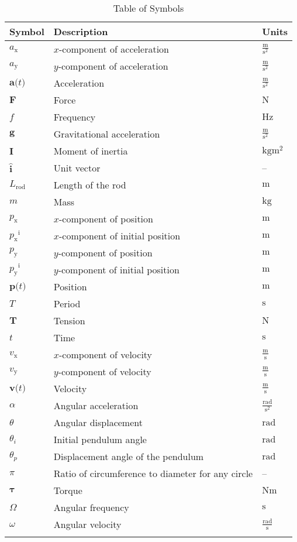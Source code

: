 \documentclass[12pt]{article}
\begin{document}
\begin{longtable}{l l l}
\toprule
\textbf{Symbol} & \textbf{Description} & \textbf{Units}
\\
\midrule
\endhead
${a_{\text{x}}}$ & $x$-component of acceleration & $\frac{\text{m}}{\text{s}^{2}}$
\\
${a_{\text{y}}}$ & $y$-component of acceleration & $\frac{\text{m}}{\text{s}^{2}}$
\\
$\symbf{a}\text{(}t\text{)}$ & Acceleration & $\frac{\text{m}}{\text{s}^{2}}$
\\
$\symbf{F}$ & Force & ${\text{N}}$
\\
$f$ & Frequency & ${\text{Hz}}$
\\
$\symbf{g}$ & Gravitational acceleration & $\frac{\text{m}}{\text{s}^{2}}$
\\
$\symbf{I}$ & Moment of inertia & $\text{kg}\text{m}^{2}$
\\
$\symbf{\hat{i}}$ & Unit vector & --
\\
${L_{\text{rod}}}$ & Length of the rod & ${\text{m}}$
\\
$m$ & Mass & ${\text{kg}}$
\\
${p_{\text{x}}}$ & $x$-component of position & ${\text{m}}$
\\
${{p_{\text{x}}}^{\text{i}}}$ & $x$-component of initial position & ${\text{m}}$
\\
${p_{\text{y}}}$ & $y$-component of position & ${\text{m}}$
\\
${{p_{\text{y}}}^{\text{i}}}$ & $y$-component of initial position & ${\text{m}}$
\\
$\symbf{p}\text{(}t\text{)}$ & Position & ${\text{m}}$
\\
$T$ & Period & ${\text{s}}$
\\
$\symbf{T}$ & Tension & ${\text{N}}$
\\
$t$ & Time & ${\text{s}}$
\\
${v_{\text{x}}}$ & $x$-component of velocity & $\frac{\text{m}}{\text{s}}$
\\
${v_{\text{y}}}$ & $y$-component of velocity & $\frac{\text{m}}{\text{s}}$
\\
$\symbf{v}\text{(}t\text{)}$ & Velocity & $\frac{\text{m}}{\text{s}}$
\\
$α$ & Angular acceleration & $\frac{\text{rad}}{\text{s}^{2}}$
\\
$θ$ & Angular displacement & ${\text{rad}}$
\\
${θ_{i}}$ & Initial pendulum angle & ${\text{rad}}$
\\
${θ_{p}}$ & Displacement angle of the pendulum & ${\text{rad}}$
\\
$π$ & Ratio of circumference to diameter for any circle & --
\\
$\symbf{τ}$ & Torque & $\text{N}\text{m}$
\\
$Ω$ & Angular frequency & ${\text{s}}$
\\
$ω$ & Angular velocity & $\frac{\text{rad}}{\text{s}}$
\\
\bottomrule
\caption{Table of Symbols}
\label{Table:ToS}
\end{longtable}
\end{document}
